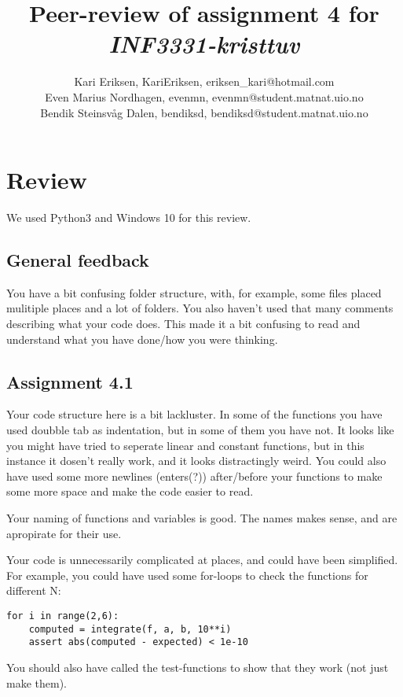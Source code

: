 \documentclass[a4paper]{article}
\title{Peer-review of assignment 4 for \textit{INF3331-kristtuv}}
\author{Kari Eriksen, KariEriksen, {eriksen\_kari@hotmail.com} \\
 		Even Marius Nordhagen, evenmn, {evenmn@student.matnat.uio.no} \\
		Bendik Steinsvåg Dalen, bendiksd, {bendiksd@student.matnat.uio.no}}
\begin{document}
\maketitle


\section{Review}\label{sec:review}

We used Python3 and Windows 10 for this review.

\subsection*{General feedback}
You have a bit confusing folder structure, with, for example, some files placed mulitiple places and a lot of folders. You also haven't used that many comments describing what your code does. This made it a bit confusing to read and understand what you have done/how you were thinking.

\subsection*{Assignment 4.1}
Your code structure here is a bit lackluster. In some of the functions you have used doubble tab as indentation, but in some of them you have not. It looks like you might have tried to seperate linear and constant functions, but in this instance it dosen't really work, and it looks distractingly weird. You could also have used some more newlines (enters(?)) after/before your functions to make some more space and make the code easier to read.

Your naming of functions and variables is good. The names makes sense, and are apropirate for their use.

Your code is unnecessarily complicated at places, and could have been simplified. For example, you could have used some for-loops to check the functions for different N:

\begin{lstlisting}
for i in range(2,6):
	computed = integrate(f, a, b, 10**i)
	assert abs(computed - expected) < 1e-10
\end{lstlisting}

You should also have called the test-functions to show that they work (not just make them).


\end{document}
